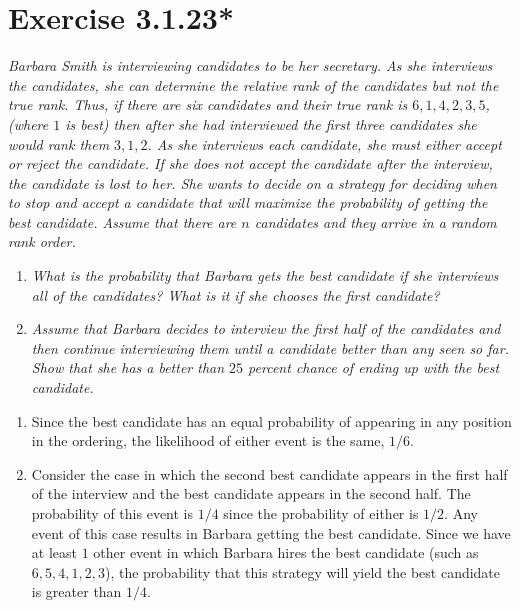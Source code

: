 \documentclass{tufte-handout}
\begin{document}
\section{Exercise 3.1.23*}

\emph{Barbara Smith is interviewing candidates to be her secretary. As
  she interviews the candidates, she can determine the relative rank
  of the candidates but not the true rank. Thus, if there are six
  candidates and their true rank is $6, 1, 4, 2, 3, 5$, (where $1$ is
  best) then after she had interviewed the first three candidates she
  would rank them $3, 1, 2$. As she interviews each candidate, she
  must either accept or reject the candidate. If she does not accept
  the candidate after the interview, the candidate is lost to her. She
  wants to decide on a strategy for deciding when to stop and accept a
  candidate that will maximize the probability of getting the best
  candidate. Assume that there are $n$ candidates and they arrive in a
  random rank order.}
\begin{enumerate}[label=\emph{(\alph*)}]
\item \emph{What is the probability that Barbara gets the best
    candidate if she interviews all of the candidates? What is it if
    she chooses the first candidate?}
\item \emph{Assume that Barbara decides to interview the first
    half of the candidates and then continue interviewing them until a
    candidate better than any seen so far. Show that she has a better
    than $25$ percent chance of ending up with the best candidate.}
\end{enumerate}

\bigskip

\begin{enumerate}[label= (\alph*)]
\item Since the best candidate has an equal probability of
  appearing in any position in the ordering, the likelihood of either
  event is the same, $1/6$.
\item Consider the case in which the second best candidate
  appears in the first half of the interview and the best candidate
  appears in the second half. The probability of this event is $1/4$
  since the probability of either is $1/2$. Any event of this case
  results in Barbara getting the best candidate. Since we have at
  least $1$ other event in which Barbara hires the best candidate
  (such as $6,5,4,1,2,3$), the probability that this strategy will
  yield the best candidate is greater than $1/4$.
\end{enumerate}
\end{document}
